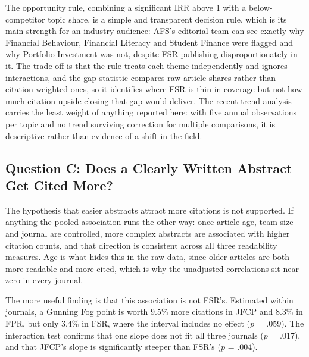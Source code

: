 \documentclass[11pt,a4paper]{article}
\begin{document}
The opportunity rule, combining a significant IRR above 1 with a below-competitor topic share, is a simple and transparent decision rule, which is its main strength for an industry audience: AFS's editorial team can see exactly why Financial Behaviour, Financial Literacy and Student Finance were flagged and why Portfolio Investment was not, despite FSR publishing disproportionately in it. The trade-off is that the rule treats each theme independently and ignores interactions, and the gap statistic compares raw article shares rather than citation-weighted ones, so it identifies where FSR is thin in coverage but not how much citation upside closing that gap would deliver. The recent-trend analysis carries the least weight of anything reported here: with five annual observations per topic and no trend surviving correction for multiple comparisons, it is descriptive rather than evidence of a shift in the field.

\subsection{Question C: Does a Clearly Written Abstract Get Cited More?}\label{question-c-does-a-clearly-written-abstract-get-cited-more-1}

The hypothesis that easier abstracts attract more citations is not supported. If anything the pooled association runs the other way: once article age, team size and journal are controlled, more complex abstracts are associated with higher citation counts, and that direction is consistent across all three readability measures. Age is what hides this in the raw data, since older articles are both more readable and more cited, which is why the unadjusted correlations sit near zero in every journal.

The more useful finding is that this association is not FSR's. Estimated within journals, a Gunning Fog point is worth 9.5\% more citations in JFCP and 8.3\% in FPR, but only 3.4\% in FSR, where the interval includes no effect (\(p\) = .059). The interaction test confirms that one slope does not fit all three journals (\(p\) = .017), and that JFCP's slope is significantly steeper than FSR's (\(p\) = .004).
\end{document}
